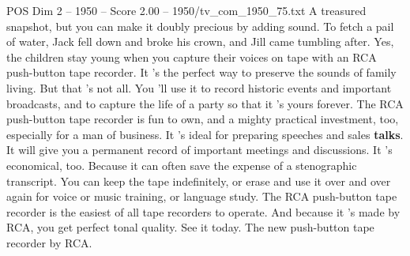 \begin{textsample}{POS Dim 2 – 1950 – Score 2.00 – 1950/tv\_com\_1950\_75.txt}  \label{ex:f2_pos_015}
A treasured snapshot, but you can make it doubly precious by adding sound.
To fetch a pail of water, Jack fell down and broke his crown, and Jill came tumbling after.
Yes, the children stay young when you capture their voices on tape with an RCA push-button tape recorder.
It 's the perfect way to preserve the sounds of family living.
But that 's not all.
You 'll use it to record historic events and important broadcasts, and to capture the life of a party so that it 's yours forever.
The RCA push-button tape recorder is fun to own, and a mighty practical investment, too, especially for a man of business.
It 's ideal for preparing speeches and sales \textbf{talks}.
It will give you a permanent record of important meetings and discussions.
It 's economical, too.
Because it can often save the expense of a stenographic transcript.
You can keep the tape indefinitely, or erase and use it over and over again for voice or music training, or language study.
The RCA push-button tape recorder is the easiest of all tape recorders to operate.
And because it 's made by RCA, you get perfect tonal quality.
See it today.
The new push-button tape recorder by RCA.

\end{textsample}
